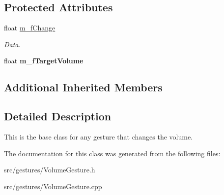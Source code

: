 \subsection*{Protected Attributes}
\begin{DoxyCompactItemize}
\item 
\mbox{\label{class_volume_gesture_adea5501a91f39da471344f8efafac3ba}} 
float \hyperlink{class_volume_gesture_adea5501a91f39da471344f8efafac3ba}{m\+\_\+f\+Change}
\begin{DoxyCompactList}\small\item\em Data. \end{DoxyCompactList}\item 
\mbox{\label{class_volume_gesture_a0694a5b06750cea8bb6a566452658eb0}} 
float {\bfseries m\+\_\+f\+Target\+Volume}
\end{DoxyCompactItemize}
\subsection*{Additional Inherited Members}


\subsection{Detailed Description}
This is the base class for any gesture that changes the volume. 

The documentation for this class was generated from the following files\+:\begin{DoxyCompactItemize}
\item 
src/gestures/Volume\+Gesture.\+h\item 
src/gestures/Volume\+Gesture.\+cpp\end{DoxyCompactItemize}
